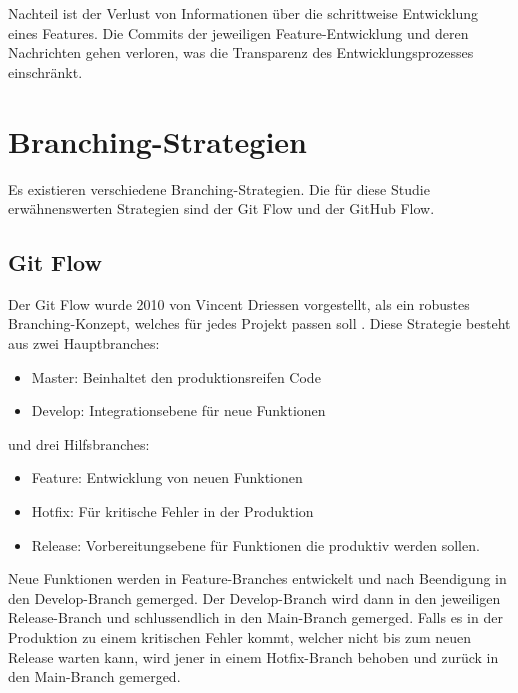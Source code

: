 Nachteil ist der Verlust von Informationen über die schrittweise Entwicklung eines Features. Die Commits der jeweiligen Feature-Entwicklung und deren Nachrichten gehen verloren, was die Transparenz des Entwicklungsprozesses einschränkt. \parencite{codoban_comparative_2015}

\section{Branching-Strategien}
Es existieren verschiedene Branching-Strategien. Die für diese Studie erwähnenswerten Strategien sind der Git Flow und der GitHub Flow. \parencite{priyanka_gowdaashwath_narayana_gowda_git-branching-and-release-strategies_2022} 
\subsection{Git Flow}
\label{sec:GitFlow}
Der Git Flow wurde 2010 von Vincent Driessen vorgestellt, als ein robustes Branch\-ing-Konzept, welches für jedes Projekt passen soll \parencite{priyanka_gowdaashwath_narayana_gowda_git-branching-and-release-strategies_2022}.
Diese Strategie besteht aus zwei Hauptbranches:
\begin{itemize}
    \item Master: Beinhaltet den produktionsreifen Code  
    \item Develop: Integrationsebene für neue Funktionen
\end{itemize}
und drei Hilfsbranches:
\begin{itemize}
    \item Feature: Entwicklung von neuen Funktionen
    \item Hotfix: Für kritische Fehler in der Produktion
    \item Release: Vorbereitungsebene für Funktionen die produktiv werden sollen.
\end{itemize}
Neue Funktionen werden in Feature-Branches entwickelt und nach Beendigung in den Develop-Branch gemerged. Der Develop-Branch wird dann in den jeweiligen Release-Branch und schlussendlich in den Main-Branch gemerged. Falls es in der Produktion zu einem kritischen Fehler kommt, welcher nicht bis zum neuen Release warten kann, wird jener in einem Hotfix-Branch behoben und zurück in den Main-Branch gemerged.
\parencite{priyanka_gowdaashwath_narayana_gowda_git-branching-and-release-strategies_2022}

